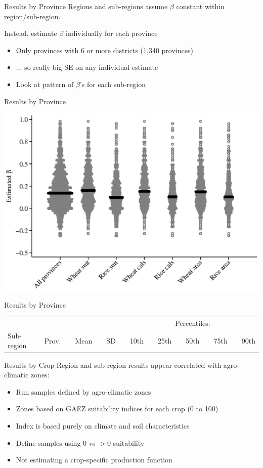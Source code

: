\documentclass[10pt, xcolor=dvipsnames]{beamer}
\begin{document}
\begin{frame}{Results by Province}
Regions and sub-regions assume $\beta$ constant within region/sub-region. 

\vspace{.2cm}Instead, estimate $\beta$ individually for each province
\begin{itemize}
  \item Only provinces with 6 or more districts (1,340 provinces)
  \item ... so really big SE on any individual estimate
  \item Look at pattern of $\beta$'s for each sub-region
\end{itemize}
\end{frame}

\begin{frame}{Results by Province}
\begin{center}
\includegraphics[width=.8\textwidth]{fig_beta_province.eps}
\end{center}
\end{frame}

\begin{frame}{Results by Province}

{\tiny
\begin{tabularx}{\textwidth}{lrXrXrXrXrXrXrXr}
\midrule
           &       &&      &&     && \multicolumn{9}{c}{Percentiles:} \\ \cmidrule{8-16}
Sub-region & Prov. && Mean && SD  && 10th    && 25th    && 50th && 75th && 90th \\
\midrule

\midrule
\end{tabularx}
}
\end{frame}

\begin{frame}{Results by Crop}
Region and sub-region results appear correlated with agro-climatic zones:
\begin{itemize}
  \item Run samples defined by agro-climatic zones
  \item Zones based on GAEZ suitability indices for each crop (0 to 100)
  \item Index is based purely on climate and soil characteristics
  \item Define samples using 0 vs $>0$ suitability
  \item Not estimating a crop-specific production function
\end{itemize}
\end{frame}
\end{document}
